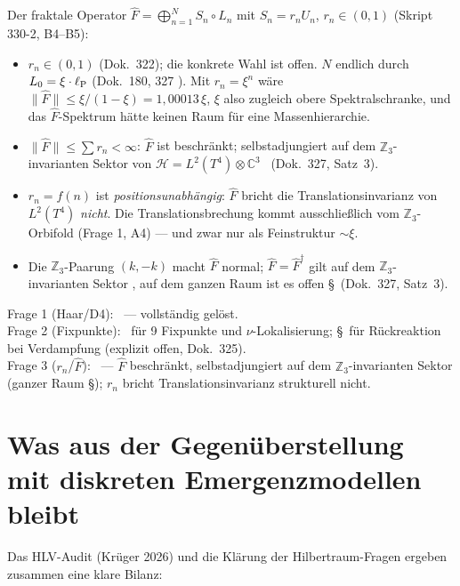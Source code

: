 Der fraktale Operator $\hat{F} = \bigoplus_{n=1}^N S_n\circ L_n$
mit $S_n = r_n U_n$, $r_n \in (0,1)$ (Skript 330-2, B4--B5):
\begin{itemize}
  \item $r_n \in (0,1)$ (Dok.~322); die konkrete Wahl ist offen.
    $N$ endlich durch $L_0 = \xi\cdot\ell_{\mathrm{P}}$ (Dok.~180, 327 \K).
    Mit $r_n = \xi^n$ wäre $\|\hat F\| \le \xi/(1-\xi) = 1{,}00013\,\xi$,
    $\xi$ also zugleich obere Spektralschranke, und das $\hat F$-Spektrum
    hätte keinen Raum für eine Massenhierarchie.
  \item $\|\hat{F}\| \leq \sum r_n < \infty$: $\hat{F}$ ist beschränkt;
    selbstadjungiert auf dem $\mathbb{Z}_3$-invarianten Sektor von
    $\mathcal{H} = L^2(T^4)\otimes\mathbb{C}^3$ \B\ (Dok.~327, Satz~3).
  \item $r_n = f(n)$ ist \emph{positionsunabhängig}: $\hat{F}$ bricht
    die Translationsinvarianz von $L^2(T^4)$ \emph{nicht}.
    Die Translationsbrechung kommt ausschließlich vom $\mathbb{Z}_3$-Orbifold
    (Frage 1, A4) — und zwar nur als Feinstruktur $\sim\xi$.
  \item Die $\mathbb{Z}_3$-Paarung $(k,-k)$ macht $\hat{F}$ normal;
    $\hat{F} = \hat{F}^\dagger$ gilt auf dem $\mathbb{Z}_3$-invarianten
    Sektor \B, auf dem ganzen Raum ist es offen \S\ (Dok.~327, Satz~3).
\end{itemize}

\begin{tcolorbox}[ffgftbox,title={Statusbilanz der drei Fragen}]
  Frage 1 (Haar/D4): \B\ — vollständig gelöst.\\
  Frage 2 (Fixpunkte): \K\ für 9 Fixpunkte und $\nu$-Lokalisierung;
  \S\ für Rückreaktion bei Verdampfung (explizit offen, Dok.~325).\\
  Frage 3 ($r_n$/$\hat{F}$): \B\ — $\hat{F}$ beschränkt, selbstadjungiert
  auf dem $\mathbb{Z}_3$-invarianten Sektor (ganzer Raum \S);
  $r_n$ bricht Translationsinvarianz strukturell nicht.
\end{tcolorbox}

\section{Was aus der Gegenüberstellung mit diskreten Emergenzmodellen bleibt}
\label{sec:bilanz}

Das HLV-Audit (Krüger 2026) und die Klärung der Hilbertraum-Fragen
ergeben zusammen eine klare Bilanz:

